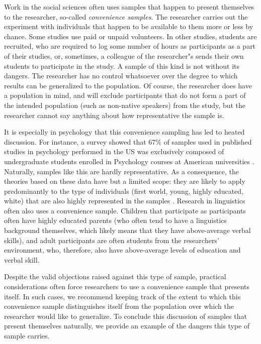 \documentclass[
]{book}
\begin{document}
Work in the social sciences often uses samples that happen to present themselves to the researcher, so-called \emph{convenience samples}. The researcher carries out the experiment with individuals that happen to be available to them more or less by chance. Some studies use paid or unpaid volunteers. In other studies, students are recruited, who are required to log some number of hours as participants as a part of their studies, or, sometimes, a colleague of the researcher"s sends their own students to participate in the study. A sample of this kind is not without its dangers. The researcher has no control whatsoever over the degree to which results can be generalized to the population. Of course, the researcher does have a population in mind, and will exclude participants that do not form a part of the intended population (such as non-native speakers) from the study, but the researcher cannot say anything about how representative the sample is.

It is especially in psychology that this convenience sampling has led to heated discussion. For instance, a survey showed that 67\% of samples used in published studies in psychology performed in the US was exclusively composed of undergraduate students enrolled in Psychology courses at American universities \citep{Henr10}. Naturally, samples like this are hardly representative. As a consequence, the theories based on these data have but a limited scope: they are likely to apply predominantly to the type of individuals (first world, young, highly educated, white) that are also highly represented in the samples \citep{Henr10}. Research in linguistics often also uses a convenience sample. Children that participate as participants often have highly educated parents (who often tend to have a linguistics background themselves, which likely means that they have above-average verbal skills), and adult participants are often students from the researchers' environment, who, therefore, also have above-average levels of education and verbal skill.

Despite the valid objections raised against this type of sample, practical considerations often force researchers to use a convenience sample that presents itself. In such cases, we recommend keeping track of the extent to which this convenience sample distinguishes itself from the population over which the researcher would like to generalize. To conclude this discussion of samples that present themselves naturally, we provide an example of the dangers this type of sample carries.
\end{document}
